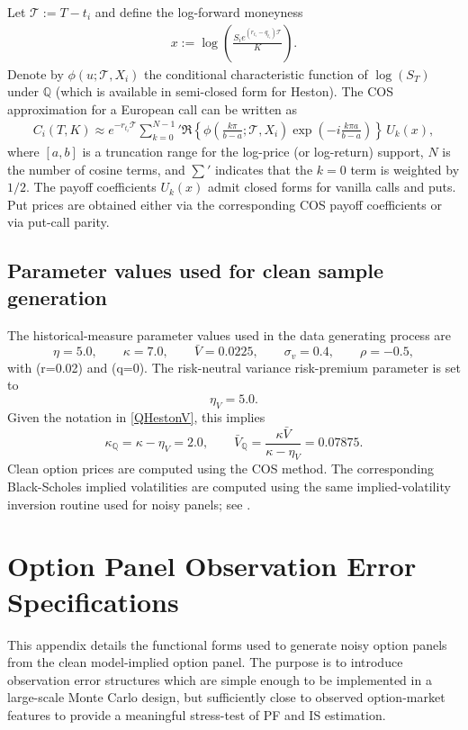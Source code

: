 \documentclass[11pt,a4paper,notitlepage]{article}
\numberwithin{equation}{section}
\begin{document}
Let $\mathcal T:=T-t_i$ and define the log-forward moneyness
\begin{align}
x:=\log\!\left(\frac{S_i e^{(r_{t_i}-q_{t_i})\mathcal T}}{K}\right).
\end{align}
Denote by $\phi(u;\mathcal T,X_i)$ the conditional characteristic function of $\log(S_T)$ under $\mathbb{Q}$
(which is available in semi-closed form for Heston). The COS approximation for a European call can be
written as
\begin{align}
C_i(T,K) \approx e^{-r_{t_i}\mathcal T}\sum_{k=0}^{N-1}{}'
\Re\!\left\{\phi\!\left(\frac{k\pi}{b-a};\mathcal T,X_i\right)\exp\!\left(-i\frac{k\pi a}{b-a}\right)\right\}
\,U_k(x),
\label{eq:COS_call}
\end{align}
where $[a,b]$ is a truncation range for the log-price (or log-return) support, $N$ is the number of cosine
terms, and $\sum'$ indicates that the $k=0$ term is weighted by $1/2$. The payoff coefficients $U_k(x)$
admit closed forms for vanilla calls and puts. Put prices are obtained either via the corresponding COS payoff
coefficients or via put-call parity.


\subsection{Parameter values used for clean sample generation}

The historical-measure parameter values used in the data generating process are
\[
\eta=5.0,\qquad
\kappa=7.0,\qquad
\bar V=0.0225,\qquad
\sigma_v=0.4,\qquad
\rho=-0.5,
\]
with (r=0.02) and (q=0). The risk-neutral variance risk-premium parameter is set to
\[
\eta_V=5.0.
\]
Given the notation in \eqref{QHestonV}, this implies
\[
\kappa_{\mathbb Q}=\kappa-\eta_V=2.0,
\qquad
\bar V_{\mathbb Q}=\frac{\kappa\bar V}{\kappa-\eta_V}=0.07875.
\]
Clean option prices are computed using the COS method. The corresponding Black-Scholes implied volatilities are computed using the same implied-volatility inversion routine used for noisy panels; see \citep{jaeckel2015lets}.

\section{Option Panel Observation Error Specifications}
\label{app:option_noise_specs}

This appendix details the functional forms used to generate noisy option panels from the clean model-implied option panel. The purpose is to introduce observation error structures which are simple enough to be implemented in a large-scale Monte Carlo design, but sufficiently close to observed option-market features to provide a meaningful stress-test of PF and IS estimation.
\end{document}
